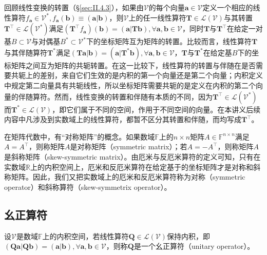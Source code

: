 \documentclass[main.tex]{subfiles}
\begin{document}
回顾线性变换的转置（\S\ref{sec:II.4.3}），如果由$\mathcal{V}$的每个向量$\mathbf{a}\in\mathcal{V}$定义一个相应的线性算符$f_\mathbf{a}\in\mathcal{V}^*,f_\mathbf{a}\left(\mathbf{b}\right)\equiv\left(\mathbf{a}|\mathbf{b}\right)$，则$\mathcal{V}$上的任一线性算符$\mathbf{T}\in\mathcal{L}\left(\mathcal{V}\right)$与其转置$\mathbf{T}^\intercal\in\mathcal{L}\left(\mathcal{V}^*\right)$满足$\left(\mathbf{T}^\intercal f_\mathbf{a}\right)\left(\mathbf{b}\right)=\left(\mathbf{a}|\mathbf{Tb}\right),\forall\mathbf{a},\mathbf{b}\in\mathcal{V}$，同时$\mathbf{T}$与$\mathbf{T}^\intercal$在给定一对基$B\subset\mathcal{V}$与对偶基$B^*\subset\mathcal{V}^*$下的坐标矩阵互为矩阵的转置。比较而言，线性算符$\mathbf{T}$与其伴随算符$\mathbf{T}^*$满足$\left(\mathbf{Ta}|\mathbf{b}\right)=\left(\mathbf{a}|\mathbf{T}^*\mathbf{b}\right),\forall\mathbf{a},\mathbf{b}\in\mathcal{V}$，$\mathbf{T}$与$\mathbf{T}^*$在给定基$B$下的坐标矩阵之间互为矩阵的共轭转置。在这一比较下，线性算符的转置与伴随在是否需要共轭上的差别，来自它们生效的是内积的第一个向量还是第二个向量；内积定义中规定第二向量具有共轭线性，所以坐标矩阵需要共轭的是定义在内积的第二个向量的伴随算符。然而，线性变换的转置和伴随有本质的不同，因为$\mathbf{T}^\intercal\in\mathcal{L}\left(\mathcal{V}^*\right)$而$\mathbf{T}^*\in\mathcal{L}\left(\mathcal{V}\right)$，即它们属于不同的空间，作用于不同空间的向量。在本讲义后续内容中凡涉及到实数域上的线性算符，都暂不区分其转置和伴随，而均写成$\mathbf{T}^\intercal$。

在矩阵代数中，有“对称矩阵”的概念。如果数域$\mathbb{F}$上的$n\times n$矩阵$A\in\mathbb{F}^{n\times n}$满足$A=A^\intercal$，则称矩阵$A$是对称矩阵（symmetric matrix）；若$A=-A^\intercal$，则称矩阵$A$是斜称矩阵（skew-symmetric matrix）。由厄米与反厄米算符的定义可知，只有在实数域$\mathbb{R}$上的内积空间上，厄米和反厄米算符在给定基于的坐标矩阵才是对称和斜称矩阵。因此，我们又把实数域上的厄米和反厄米算符称为对称（symmetric operator）和斜称算符（skew-symmetrix operator）。

\subsection{幺正算符}

\begin{definition}[幺正算符]\label{def:II.6.2}
设$\mathcal{V}$是数域$\mathbb{F}$上的内积空间，若线性算符$\mathbf{Q}\in\mathcal{L}\left(\mathcal{V}\right)$保持内积，即$\left(\mathbf{Qa}|\mathbf{Qb}\right)=\left(\mathbf{a}|\mathbf{b}\right),\forall\mathbf{a},\mathbf{b}\in\mathcal{V}$，则称$\mathbf{Q}$是一个幺正算符（unitary operator）。
\end{definition}
\end{document}
